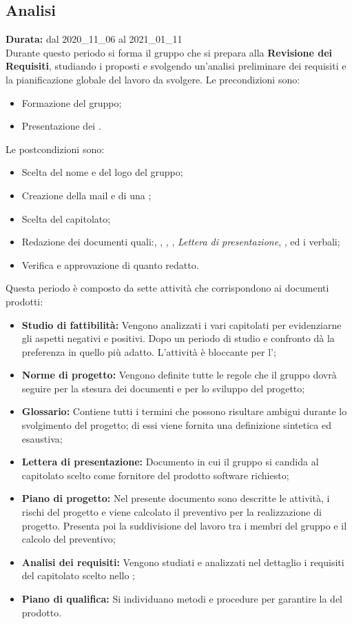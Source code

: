 \subsection{Analisi}
\label{analisi}
\textbf{Durata:} dal 2020\_11\_06 al 2021\_01\_11\\
Durante questo periodo si forma il gruppo che si prepara alla \textbf{Revisione dei Requisiti}, studiando i  proposti e svolgendo un'analisi preliminare dei requisiti e la pianificazione globale del lavoro da svolgere. 
Le precondizioni sono:
\begin{itemize}
    \item Formazione del gruppo;
    \item Presentazione dei .
\end{itemize}
Le postcondizioni sono:
\begin{itemize}
    \item Scelta del nome e del logo del gruppo;
    \item Creazione della mail e di una  ;
    \item Scelta del capitolato;
    \item Redazione dei documenti quali:{\SdF}, {\NdP}, {\PdP}, {\Glossario}, \textit{Lettera di presentazione}, {\PdQ}, {\AdR} ed i verbali;
    \item Verifica e approvazione di quanto redatto.
\end{itemize}
Questa periodo è composto da sette attività che corrispondono ai documenti prodotti:
\begin{itemize}
    \item \textbf{Studio di fattibilità:} Vengono analizzati i vari capitolati per evidenziarne gli aspetti negativi e positivi. Dopo un periodo di studio e confronto {\Gruppo} dà la preferenza in quello più adatto. L'attività è bloccante per l'{\AdR};
    \item \textbf{Norme di progetto:} Vengono definite tutte le regole che il gruppo {\Gruppo} dovrà seguire per la stesura dei documenti e per lo sviluppo del progetto;
    \item \textbf{Glossario:} Contiene tutti i termini che possono risultare ambigui durante lo svolgimento del progetto; di essi viene fornita una definizione sintetica ed esaustiva;
    \item \textbf{Lettera di presentazione:} Documento in cui il gruppo {\Gruppo} si candida al capitolato scelto come fornitore del prodotto software richiesto;
    \item \textbf{Piano di progetto:} Nel presente documento sono descritte le attività, i rischi del progetto e viene calcolato il preventivo per la realizzazione di progetto. Presenta poi la suddivisione del lavoro tra i membri del gruppo {\Gruppo} e il calcolo del preventivo;
    \item \textbf{Analisi dei requisiti:} Vengono studiati e analizzati nel dettaglio i requisiti del capitolato scelto nello {\SdF};
    \item \textbf{Piano di qualifica:} Si individuano metodi e procedure per garantire la  del prodotto.
\end{itemize}
